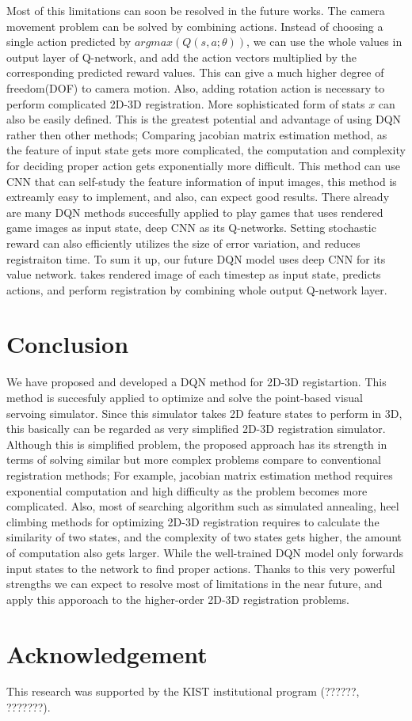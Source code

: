 \documentclass[10pt]{article}
\begin{document}
  Most of this limitations can soon be resolved in the future works. The camera movement problem can be solved by combining actions. Instead of choosing a single action predicted by $argmax(Q(s, a; \theta ))$, we can use the whole values in output layer of Q-network, and add the action vectors multiplied by the corresponding predicted reward values. This can give a much higher degree of freedom(DOF) to camera motion. Also, adding rotation action is necessary to perform complicated 2D-3D registration. More sophisticated form of stats $x$ can also be easily defined. This is the greatest potential and advantage of using DQN rather then other methods; Comparing jacobian matrix estimation method, as the feature of input state gets more complicated, the computation and complexity for deciding proper action gets exponentially more difficult.
  This method can use CNN that can self-study the feature information of input images, this method is extreamly easy to implement, and also, can expect good results. There already are many DQN methods succesfully applied to play games that uses rendered game images as input state, deep CNN as its Q-networks\cite{ref2}. Setting stochastic reward can also efficiently utilizes the size of error variation, and reduces registraiton time. To sum it up, our future DQN model uses deep CNN for its value network. takes rendered image of each timestep as input state, predicts actions, and perform registration by combining whole output Q-network layer.



\section{Conclusion}

We have proposed and developed a DQN method for 2D-3D registartion. This method is succesfuly applied to optimize and solve the point-based visual servoing simulator. Since this simulator takes 2D feature states to perform in 3D, this basically can be regarded as very simplified 2D-3D registration simulator. Although this is simplified problem, the proposed approach has its strength in terms of solving similar but more complex problems compare to conventional registration methods; For example, jacobian matrix estimation method requires exponential computation and high difficulty as the problem becomes more complicated. Also, most of searching algorithm such as simulated annealing, heel climbing methods for optimizing 2D-3D registration requires to calculate the similarity of two states, and the complexity of two states gets higher, the amount of computation also gets larger. While the well-trained DQN model only forwards input states to the network to find proper actions. Thanks to this very powerful strengths we can expect to resolve most of limitations in the near future, and apply this apporoach to the higher-order 2D-3D registration problems.


\section*{Acknowledgement}
This research was supported by the KIST institutional program (??????, ???????).


\newpage


\end{document}
